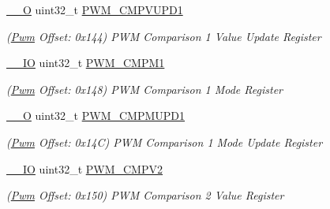 \begin{DoxyCompactItemize}
\mbox{\label{structPwm_a7a22a51b88cd7c08a7a4ec358f15935d}} 
\mbox{\hyperlink{core__cm7_8h_a7e25d9380f9ef903923964322e71f2f6}{\+\_\+\+\_\+O}} uint32\+\_\+t \mbox{\hyperlink{structPwm_a7a22a51b88cd7c08a7a4ec358f15935d}{P\+W\+M\+\_\+\+C\+M\+P\+V\+U\+P\+D1}}
\begin{DoxyCompactList}\small\item\em (\mbox{\hyperlink{structPwm}{Pwm}} Offset\+: 0x144) P\+WM Comparison 1 Value Update Register \end{DoxyCompactList}\item 
\mbox{\label{structPwm_a4d3202730a4f6d538c86c48890a3f090}} 
\mbox{\hyperlink{core__cm7_8h_aec43007d9998a0a0e01faede4133d6be}{\+\_\+\+\_\+\+IO}} uint32\+\_\+t \mbox{\hyperlink{structPwm_a4d3202730a4f6d538c86c48890a3f090}{P\+W\+M\+\_\+\+C\+M\+P\+M1}}
\begin{DoxyCompactList}\small\item\em (\mbox{\hyperlink{structPwm}{Pwm}} Offset\+: 0x148) P\+WM Comparison 1 Mode Register \end{DoxyCompactList}\item 
\mbox{\label{structPwm_a09a9b9c76b079762bb4f31d5cc2d21ac}} 
\mbox{\hyperlink{core__cm7_8h_a7e25d9380f9ef903923964322e71f2f6}{\+\_\+\+\_\+O}} uint32\+\_\+t \mbox{\hyperlink{structPwm_a09a9b9c76b079762bb4f31d5cc2d21ac}{P\+W\+M\+\_\+\+C\+M\+P\+M\+U\+P\+D1}}
\begin{DoxyCompactList}\small\item\em (\mbox{\hyperlink{structPwm}{Pwm}} Offset\+: 0x14C) P\+WM Comparison 1 Mode Update Register \end{DoxyCompactList}\item 
\mbox{\label{structPwm_a62c796eee6ffeddfe9db1116f1f8628c}} 
\mbox{\hyperlink{core__cm7_8h_aec43007d9998a0a0e01faede4133d6be}{\+\_\+\+\_\+\+IO}} uint32\+\_\+t \mbox{\hyperlink{structPwm_a62c796eee6ffeddfe9db1116f1f8628c}{P\+W\+M\+\_\+\+C\+M\+P\+V2}}
\begin{DoxyCompactList}\small\item\em (\mbox{\hyperlink{structPwm}{Pwm}} Offset\+: 0x150) P\+WM Comparison 2 Value Register \end{DoxyCompactList}\item 
\mbox{\label{structPwm_ae6366058a6fd65aeae1a2bfd9d971c06}} 

\end{DoxyCompactItemize}
